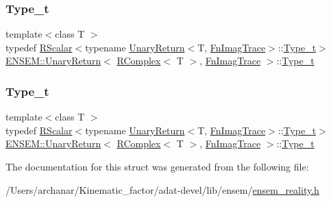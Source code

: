 \subsubsection{\texorpdfstring{Type\_t}{Type\_t}\hspace{0.1cm}{\footnotesize\ttfamily [2/3]}}
{\footnotesize\ttfamily template$<$class T $>$ \\
typedef \mbox{\hyperlink{classENSEM_1_1RScalar}{R\+Scalar}}$<$typename \mbox{\hyperlink{structENSEM_1_1UnaryReturn}{Unary\+Return}}$<$T, \mbox{\hyperlink{structENSEM_1_1FnImagTrace}{Fn\+Imag\+Trace}}$>$\+::\mbox{\hyperlink{structENSEM_1_1UnaryReturn_3_01RComplex_3_01T_01_4_00_01FnImagTrace_01_4_a0a6fd745f329be78992f62eebd7ef256}{Type\+\_\+t}}$>$ \mbox{\hyperlink{structENSEM_1_1UnaryReturn}{E\+N\+S\+E\+M\+::\+Unary\+Return}}$<$ \mbox{\hyperlink{classENSEM_1_1RComplex}{R\+Complex}}$<$ T $>$, \mbox{\hyperlink{structENSEM_1_1FnImagTrace}{Fn\+Imag\+Trace}} $>$\+::\mbox{\hyperlink{structENSEM_1_1UnaryReturn_3_01RComplex_3_01T_01_4_00_01FnImagTrace_01_4_a0a6fd745f329be78992f62eebd7ef256}{Type\+\_\+t}}}

\mbox{\label{structENSEM_1_1UnaryReturn_3_01RComplex_3_01T_01_4_00_01FnImagTrace_01_4_a0a6fd745f329be78992f62eebd7ef256}} 
\subsubsection{\texorpdfstring{Type\_t}{Type\_t}\hspace{0.1cm}{\footnotesize\ttfamily [3/3]}}
{\footnotesize\ttfamily template$<$class T $>$ \\
typedef \mbox{\hyperlink{classENSEM_1_1RScalar}{R\+Scalar}}$<$typename \mbox{\hyperlink{structENSEM_1_1UnaryReturn}{Unary\+Return}}$<$T, \mbox{\hyperlink{structENSEM_1_1FnImagTrace}{Fn\+Imag\+Trace}}$>$\+::\mbox{\hyperlink{structENSEM_1_1UnaryReturn_3_01RComplex_3_01T_01_4_00_01FnImagTrace_01_4_a0a6fd745f329be78992f62eebd7ef256}{Type\+\_\+t}}$>$ \mbox{\hyperlink{structENSEM_1_1UnaryReturn}{E\+N\+S\+E\+M\+::\+Unary\+Return}}$<$ \mbox{\hyperlink{classENSEM_1_1RComplex}{R\+Complex}}$<$ T $>$, \mbox{\hyperlink{structENSEM_1_1FnImagTrace}{Fn\+Imag\+Trace}} $>$\+::\mbox{\hyperlink{structENSEM_1_1UnaryReturn_3_01RComplex_3_01T_01_4_00_01FnImagTrace_01_4_a0a6fd745f329be78992f62eebd7ef256}{Type\+\_\+t}}}



The documentation for this struct was generated from the following file\+:\begin{DoxyCompactItemize}
\item 
/\+Users/archanar/\+Kinematic\+\_\+factor/adat-\/devel/lib/ensem/\mbox{\hyperlink{adat-devel_2lib_2ensem_2ensem__reality_8h}{ensem\+\_\+reality.\+h}}\end{DoxyCompactItemize}
